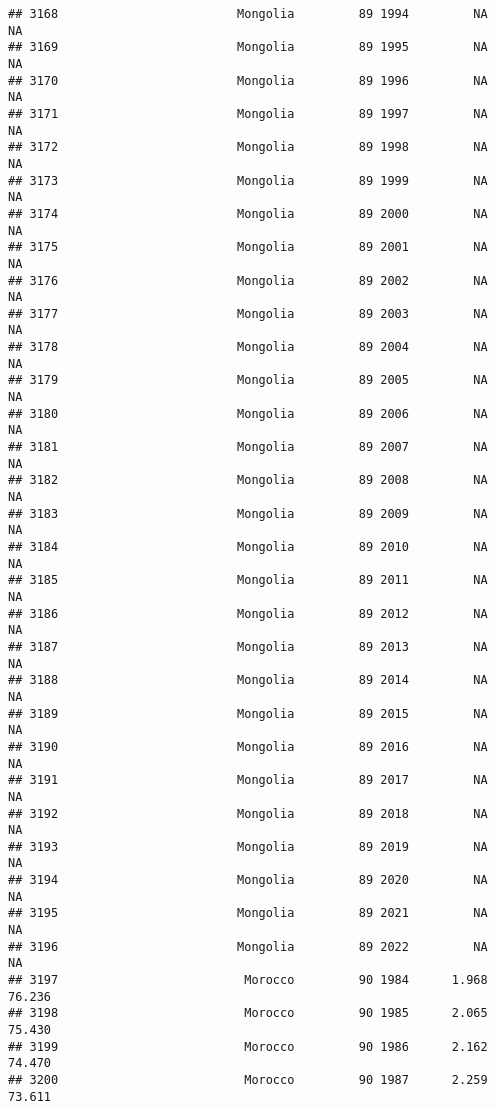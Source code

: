 \documentclass[
]{article}
\begin{document}
\begin{verbatim}
## 3168                         Mongolia         89 1994         NA         NA
## 3169                         Mongolia         89 1995         NA         NA
## 3170                         Mongolia         89 1996         NA         NA
## 3171                         Mongolia         89 1997         NA         NA
## 3172                         Mongolia         89 1998         NA         NA
## 3173                         Mongolia         89 1999         NA         NA
## 3174                         Mongolia         89 2000         NA         NA
## 3175                         Mongolia         89 2001         NA         NA
## 3176                         Mongolia         89 2002         NA         NA
## 3177                         Mongolia         89 2003         NA         NA
## 3178                         Mongolia         89 2004         NA         NA
## 3179                         Mongolia         89 2005         NA         NA
## 3180                         Mongolia         89 2006         NA         NA
## 3181                         Mongolia         89 2007         NA         NA
## 3182                         Mongolia         89 2008         NA         NA
## 3183                         Mongolia         89 2009         NA         NA
## 3184                         Mongolia         89 2010         NA         NA
## 3185                         Mongolia         89 2011         NA         NA
## 3186                         Mongolia         89 2012         NA         NA
## 3187                         Mongolia         89 2013         NA         NA
## 3188                         Mongolia         89 2014         NA         NA
## 3189                         Mongolia         89 2015         NA         NA
## 3190                         Mongolia         89 2016         NA         NA
## 3191                         Mongolia         89 2017         NA         NA
## 3192                         Mongolia         89 2018         NA         NA
## 3193                         Mongolia         89 2019         NA         NA
## 3194                         Mongolia         89 2020         NA         NA
## 3195                         Mongolia         89 2021         NA         NA
## 3196                         Mongolia         89 2022         NA         NA
## 3197                          Morocco         90 1984      1.968     76.236
## 3198                          Morocco         90 1985      2.065     75.430
## 3199                          Morocco         90 1986      2.162     74.470
## 3200                          Morocco         90 1987      2.259     73.611

\end{verbatim}
\end{document}

